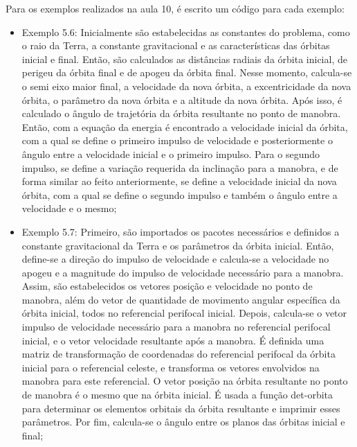 Para os exemplos realizados na aula 10, é escrito um código para cada exemplo: 

\begin{itemize}
    \item Exemplo 5.6: Inicialmente são estabelecidas as constantes do problema, como o raio da Terra, a constante gravitacional e as características das órbitas inicial e final. Então, são calculados as distâncias radiais da órbita inicial, de perigeu da órbita final e de apogeu da órbita final. Nesse momento, calcula-se o semi eixo maior final, a velocidade da nova órbita, a excentricidade da nova órbita, o parâmetro da nova órbita e a altitude da nova órbita. Após isso, é calculado o ângulo de trajetória da órbita resultante no ponto de manobra. Então, com a equação da energia é encontrado a velocidade inicial da órbita, com a qual se define o primeiro impulso de velocidade e posteriormente o ângulo entre a velocidade inicial e o primeiro impulso. Para o segundo impulso, se define a variação requerida da inclinação para a manobra, e de forma similar ao feito anteriormente, se define a velocidade inicial da nova órbita, com a qual se define o segundo impulso e também o ângulo entre a velocidade e o mesmo;
    
    \item Exemplo 5.7: Primeiro, são importados os pacotes necessários e definidos a constante gravitacional da Terra e os parâmetros da órbita inicial. Então, define-se a direção do impulso de velocidade e calcula-se a velocidade no apogeu e a magnitude do impulso de velocidade necessário para a manobra. Assim, são estabelecidos os vetores posição e velocidade no ponto de manobra, além do vetor de quantidade de movimento angular específica da órbita inicial, todos no referencial perifocal inicial. Depois, calcula-se o vetor impulso de velocidade necessário para a manobra no referencial perifocal inicial, e o vetor velocidade resultante após a manobra. É definida uma matriz de transformação de coordenadas do referencial perifocal da órbita inicial para o referencial celeste, e transforma os vetores envolvidos na manobra para este referencial. O vetor posição na órbita resultante no ponto de manobra é o mesmo que na órbita inicial. É usada a função det-orbita para determinar os elementos orbitais da órbita resultante e imprimir esses parâmetros. Por fim, calcula-se o ângulo entre os planos das órbitas inicial e final;


\end{itemize}
